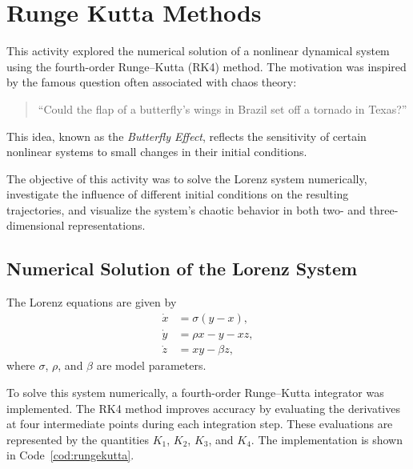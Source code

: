 \documentclass[../portafolio.tex]{subfiles}
\begin{document}
\section{Runge Kutta Methods}   %


\medskip


This activity explored the numerical solution of a nonlinear dynamical system using the fourth-order Runge--Kutta (RK4) method. The motivation was inspired by the famous question often associated with chaos theory:
\begin{quote}
``Could the flap of a butterfly's wings in Brazil set off a tornado in Texas?''
\end{quote}
This idea, known as the \textit{Butterfly Effect}, reflects the sensitivity of certain nonlinear systems to small changes in their initial conditions.

The objective of this activity was to solve the Lorenz system numerically, investigate the influence of different initial conditions on the resulting trajectories, and visualize the system's chaotic behavior in both two- and three-dimensional representations.


\subsection{Numerical Solution of the Lorenz System}

The Lorenz equations are given by
\begin{align}
\dot{x} &= \sigma(y-x), \nonumber \\
\dot{y} &= \rho x - y - xz, \nonumber \\
\dot{z} &= xy - \beta z,
\label{eq1}
\end{align}
where $\sigma$, $\rho$, and $\beta$ are model parameters.

To solve this system numerically, a fourth-order Runge--Kutta integrator was implemented. The RK4 method improves accuracy by evaluating the derivatives at four intermediate points during each integration step. These evaluations are represented by the quantities $K_1$, $K_2$, $K_3$, and $K_4$. The implementation is shown in Code~\ref{cod:rungekutta}.
\end{document}
